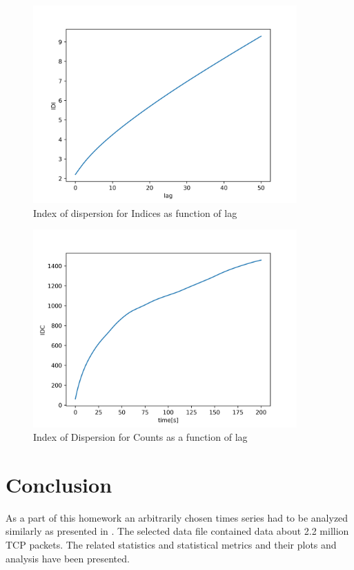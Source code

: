 \documentclass[a4paper]{article}
\begin{document}
\begin{figure}[H]
    \centering
    \includegraphics[width=0.9\textwidth]{figures/idi.png}
    \caption{Index of dispersion for Indices as function of lag}
    \label{fig:idi}
\end{figure}

\begin{figure}[H]
    \centering
    \includegraphics[width=0.9\textwidth]{figures/idc.png}
    \caption{Index of Dispersion for Counts as a function of lag}
    \label{fig:idc}
\end{figure}
	
	
\section{Conclusion}

As a part of this homework an arbitrarily chosen times series had to be analyzed similarly as presented in \cite{MolnarOnburst}. 
The selected data file contained data about 2.2 million TCP packets. The related statistics and statistical metrics and their plots and analysis have been presented.



\end{document}
